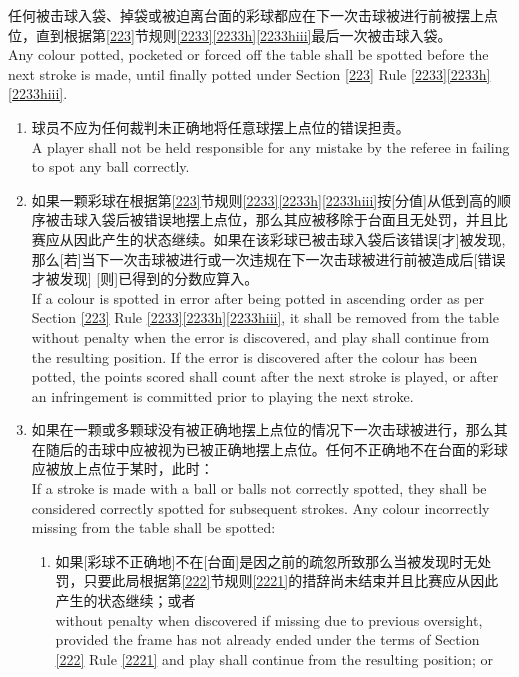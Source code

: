 \noindent 任何被击球入袋、掉袋或被迫离台面的彩球都应在下一次击球被进行前被摆上点位，直到根据第\ref{223}节规则\ref{2233}\ref{2233h}\ref{2233hiii}最后一次被击球入袋。\\
Any colour potted, pocketed or forced off the table shall be spotted before the next stroke is made, until finally potted under Section \ref{223} Rule \ref{2233}\ref{2233h}\ref{2233hiii}.
\begin{enumerate}[label=(\alph*)]
    \item 球员不应为任何裁判未正确地将任意球摆上点位的错误担责。\\
    A player shall not be held responsible for any mistake by the referee in failing to spot any ball correctly.
    \item 如果一颗彩球在根据第\ref{223}节规则\ref{2233}\ref{2233h}\ref{2233hiii}按[分值]从低到高的顺序被击球入袋后被错误地摆上点位，那么其应被移除于台面且无处罚，并且比赛应从因此产生的状态继续。如果在该彩球已被击球入袋后该错误[才]被发现, 那么[若]当下一次击球被进行或一次违规在下一次击球被进行前被造成后[错误才被发现] [则]已得到的分数应算入。\\
    If a colour is spotted in error after being potted in ascending order as per Section \ref{223} Rule \ref{2233}\ref{2233h}\ref{2233hiii}, it shall be removed from the table without penalty when the error is discovered, and play shall continue from the resulting position. If the error is discovered after the colour has been potted, the points scored shall count after the next stroke is played, or after an infringement is committed prior to playing the next stroke.
    \item \label{2237c}如果在一颗或多颗球没有被正确地摆上点位的情况下一次击球被进行，那么其在随后的击球中应被视为已被正确地摆上点位。任何不正确地不在台面的彩球应被放上点位于某时，此时：\\
    If a stroke is made with a ball or balls not correctly spotted, they shall be considered correctly spotted for subsequent strokes. Any colour incorrectly missing from the table shall be spotted:
    \begin{enumerate}[label=(\roman*)]
        \item 如果[彩球不正确地]不在[台面]是因之前的疏忽所致那么当被发现时无处罚，只要此局根据第\ref{222}节规则\ref{2221}的措辞尚未结束并且比赛应从因此产生的状态继续；或者\\
        without penalty when discovered if missing due to previous oversight, provided the frame has not already ended under the terms of Section \ref{222} Rule \ref{2221} and play shall continue from the resulting position; or

\end{enumerate}
\end{enumerate}
